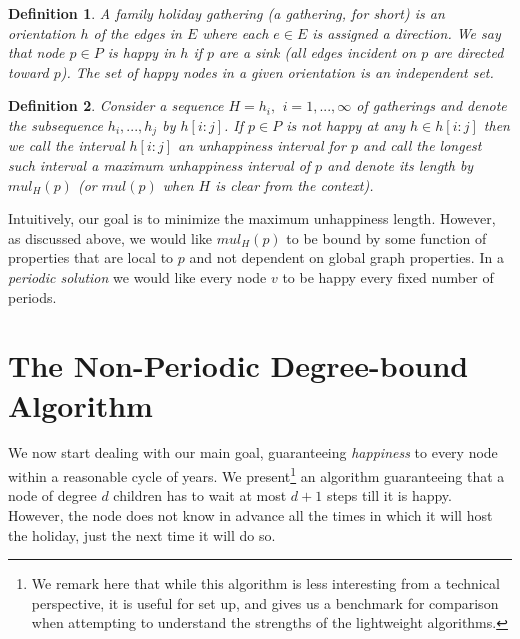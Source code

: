 \documentclass[11pt]{article}
\newtheorem{definition}{Definition}[section]
\begin{document}
\begin{definition}\label{d:gathering}
A {\em family holiday gathering} (a {\em gathering},
for short) is an orientation $h$ of the edges in $E$ where each $e\in E$ is assigned a direction. We say that node $p\in P$ is {\em happy} in $h$ if $p$ are a sink (all edges incident on $p$ are directed toward $p$). The set of happy nodes in a given orientation is an independent set.
\end{definition}





\begin{definition}\label{d:seg}
Consider a sequence $H=h_i,\,\ i=1,...,\infty$ of
gatherings and denote the subsequence $h_i,...,h_j$ by
$h[i:j]$. If $p \in P$ is not happy at any $h \in h[i:j]$ then we
call the interval $h[i:j]$ an {\em unhappiness interval} for
$p$ and call the longest such interval a {\em maximum unhappiness interval} of $p$ and denote its length by $mul_H(p)$ (or $mul(p)$ when $H$ is clear from the context).
\end{definition}



Intuitively, our goal is to minimize the maximum unhappiness
length. However, as discussed above, we would like $mul_H(p)$ to be bound by some function of properties that are local to $p$ and not dependent on global graph properties. In a {\em periodic solution} we would like every node $v$ to be happy every fixed number of periods.

\section{The Non-Periodic Degree-bound Algorithm}\label{s:global}


We now start dealing with our main goal, guaranteeing {\em happiness} to
every node within a reasonable cycle of years. We present\footnote{We remark here that while this algorithm is less interesting from a technical perspective, it is useful for set up, and gives us a benchmark for comparison when attempting to understand the strengths of the lightweight algorithms.
} an algorithm guaranteeing that a node of degree $d$ children has to wait at most $d+1$ steps till  it is happy.  However, the node does not know in advance all the times in which it will host the holiday, just the next time it will  do so.
\end{document}
